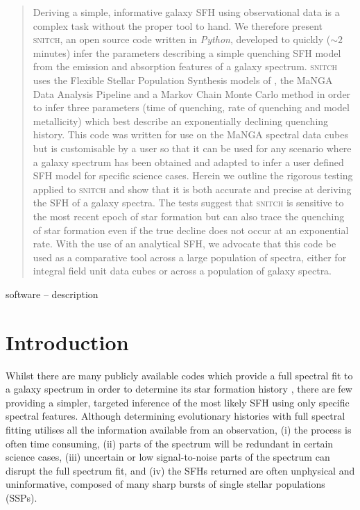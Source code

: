 \documentclass[useAMS,usenatbib]{mn2e}
\begin{document}
\begin{abstract}
Deriving a simple, informative galaxy SFH using observational data is a complex task without the proper tool to hand. We therefore present \textsc{snitch}, an open source code written in \emph{Python}, developed to quickly ($\sim2$ minutes) infer the parameters describing a simple quenching SFH model from the emission and absorption features of a galaxy spectrum. \textsc{snitch} uses the Flexible Stellar Population Synthesis models of \cite{conroy09}, the MaNGA Data Analysis Pipeline and a Markov Chain Monte Carlo method in order to infer three parameters (time of quenching, rate of quenching and model metallicity) which best describe an exponentially declining quenching history. This code was written for use on the MaNGA spectral data cubes but is customisable by a user so that it can be used for any scenario where a galaxy spectrum has been obtained and adapted to infer a user defined SFH model for specific science cases. Herein we outline the rigorous testing applied to \textsc{snitch} and show that it is both accurate and precise at deriving the SFH of a galaxy spectra. The tests suggest that \textsc{snitch} is sensitive to the most recent epoch of star formation but can also trace the quenching of star formation even if the true decline does not occur at an exponential rate. With the use of an analytical SFH, we advocate that this code be used as a comparative tool across a large population of spectra, either for integral field unit data cubes or across a population of galaxy spectra. 
\end{abstract}

\begin{keywords}
software -- description
\end{keywords}

\section{Introduction}

Whilst there are many publicly available codes which provide a full spectral fit to a galaxy spectrum in order to determine its star formation history \citep[SFH;][]{cappellari04, cidfernandes05, ocvirk06, tojeiro07, noll09, conroy14, chevallard16, wilkinson17}, there are few providing a simpler, targeted inference of the most likely SFH using only specific spectral features. Although determining evolutionary histories with full spectral fitting utilises all the information available from an observation, (i) the process is often time consuming, (ii) parts of the spectrum will be redundant in certain science cases, (iii) uncertain or low signal-to-noise parts of the spectrum can disrupt the full spectrum fit, and (iv) the SFHs returned are often unphysical and uninformative, composed of many sharp bursts of single stellar populations (SSPs).
\end{document}

